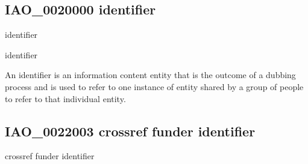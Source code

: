 \documentclass[letterpaper,10pt,english]{sphinxmanual}
\begin{document}
\subsection{IAO\_0020000 \sphinxhyphen{} identifier}
\label{\detokenize{doc-IAO_0020000:iao-0020000-identifier}}\label{\detokenize{doc-IAO_0020000:index-0}}\label{\detokenize{doc-IAO_0020000::doc}}
\begin{sphinxShadowBox}

\sphinxAtStartPar
identifier
\end{sphinxShadowBox}

\begin{sphinxShadowBox}

\sphinxAtStartPar
identifier
\end{sphinxShadowBox}

\begin{sphinxShadowBox}

\sphinxAtStartPar
{\hyperref[\detokenize{doc-IAO_0000030::doc}]{}}
\end{sphinxShadowBox}

\begin{sphinxShadowBox}

\sphinxAtStartPar
An identifier is an information content entity that is the outcome of a dubbing process and is used to refer to one instance of entity shared by a group of people to refer to that individual entity.
\end{sphinxShadowBox}

\begin{sphinxShadowBox}

\sphinxAtStartPar
{}
\end{sphinxShadowBox}
\begin{quote}

\ignorespaces \end{quote}


\subsection{IAO\_0022003 \sphinxhyphen{} crossref funder identifier}
\label{\detokenize{doc-IAO_0022003:iao-0022003-crossref-funder-identifier}}\label{\detokenize{doc-IAO_0022003:index-0}}\label{\detokenize{doc-IAO_0022003::doc}}
\begin{sphinxShadowBox}

\sphinxAtStartPar
crossref funder identifier
\end{sphinxShadowBox}
\end{document}
